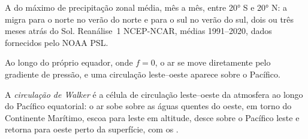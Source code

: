\begin{omfigure}

{\small A  do máximo de precipitação zonal média, mês a mês, entre \ang{20} S e \ang{20} N: a
 migra para o norte no verão do norte e para o sul no verão do sul,
dois ou três meses atrás do Sol. Reanálise~1 NCEP-NCAR, médias 1991--2020, dados fornecidos pelo NOAA
PSL.}
\label{fig:b1:atmospheric-circulation:itcz}
\end{omfigure}

Ao longo do próprio equador, onde $f = 0$, o ar se move diretamente pelo gradiente de pressão, e uma
circulação leste--oeste aparece sobre o Pacífico.

\begin{definition}\label{def:b1:atmospheric-circulation:walker}
A \emph{circulação de Walker} é a célula de circulação leste--oeste da
atmosfera ao longo do Pacífico equatorial: o ar sobe sobre as águas quentes do oeste, em torno do
Continente Marítimo, escoa para leste em altitude, desce sobre o Pacífico leste e retorna para oeste
perto da superfície, com os .
\end{definition}

